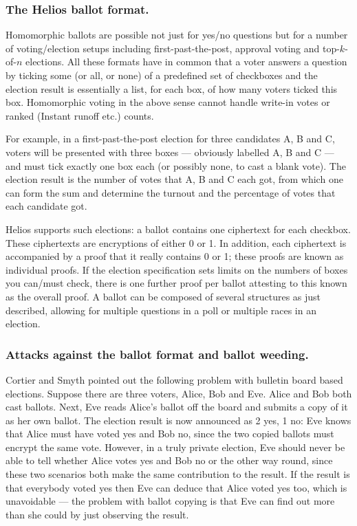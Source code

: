 \documentclass[envcountsame]{llncs}
\newenvironment{helios}{\begin{framed}
\vspace{-18pt}
\begin{figure}
\vspace{-12pt}\quad{\Huge \Sun}
\end{figure}}{\end{framed}}
\begin{document}
\begin{helios}
\subsubsection{The Helios ballot format.}
Homomorphic ballots are possible not just for yes/no questions but for a number
of voting/election setups including first-past-the-post, approval voting and
top-$k$-of-$n$ elections. All these formats have in common that a voter answers
a question by ticking some (or all, or none) of a predefined set of checkboxes
and the election result is essentially a list, for each box, of how many voters
ticked this box.
Homomorphic voting in the above sense cannot handle write-in votes or ranked
(Instant runoff etc.) counts.

For example, in a first-past-the-post election for three candidates A, B and C,
voters will be presented with three boxes --- obviously labelled A, B and C ---
and must tick exactly one box each (or possibly none, to cast a blank vote). The
election result is the number of votes that A, B and C each got, from which one
can form the sum and determine the turnout and the percentage of votes that each
candidate got.

Helios supports such elections: a ballot contains one ciphertext for each
checkbox. These ciphertexts are encryptions of either 0 or 1. In addition, each
ciphertext is accompanied by a proof that it really contains 0 or 1; these
proofs are known as individual proofs. If the election specification sets limits
on the numbers of boxes you can/must check, there is one further proof per
ballot attesting to this known as the overall proof. A ballot can be composed of
several structures as just described, allowing for multiple questions in a poll
or multiple races in an election.

\subsubsection{Attacks against the ballot format and ballot weeding.}
Cortier and Smyth \cite{CS13} pointed out the following problem with bulletin
board based elections. Suppose there are three voters, Alice, Bob and Eve. Alice
and Bob both cast ballots. Next, Eve reads Alice's ballot off the board and
submits a copy of it as her own ballot. The election result is now announced as
2 yes, 1 no: Eve knows that Alice must have voted yes and Bob no, since the two
copied ballots must encrypt the same vote. However, in a truly private election,
Eve should never be able to tell whether Alice votes yes and Bob no or the other
way round, since these two scenarios both make the same contribution to the
result. If the result is that everybody voted yes then Eve can deduce that Alice
voted yes too, which is unavoidable --- the problem with ballot copying is that
Eve can find out more than she could by just observing the result.


\end{helios}
\end{document}

